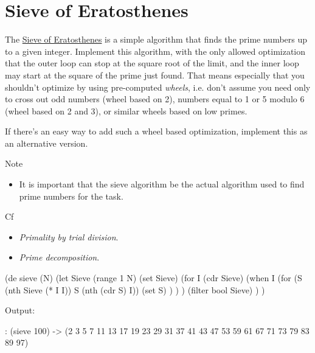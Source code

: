 \pagebreak{}
\section*{Sieve of Eratosthenes}

The \href{http://en.wikipedia.org/wiki/Sieve\_of\_Eratosthenes}{Sieve of
Eratosthenes} is a simple algorithm that finds the prime numbers up to a
given integer. Implement this algorithm, with the only allowed
optimization that the outer loop can stop at the square root of the
limit, and the inner loop may start at the square of the prime just
found. That means especially that you shouldn't optimize by using
pre-computed \emph{wheels}, i.e. don't assume you need only to cross out
odd numbers (wheel based on 2), numbers equal to 1 or 5 modulo 6 (wheel
based on 2 and 3), or similar wheels based on low primes.

If there's an easy way to add such a wheel based optimization, implement
this as an alternative version.

\begin{description}
\item[Note]
\end{description}

\begin{itemize}
\item
  It is important that the sieve algorithm be the actual algorithm used
  to find prime numbers for the task.
\end{itemize}

\begin{description}
\item[Cf]
\end{description}

\begin{itemize}
\item \emph{Primality by trial division}.
\item \emph{Prime decomposition}.
\end{itemize}


\begin{wideverbatim}

(de sieve (N)
   (let Sieve (range 1 N)
      (set Sieve)
      (for I (cdr Sieve)
         (when I
            (for (S (nth Sieve (* I I)) S (nth (cdr S) I))
               (set S) ) ) )
      (filter bool Sieve) ) )

Output:

: (sieve 100)
-> (2 3 5 7 11 13 17 19 23 29 31 37 41 43 47 53 59 61 67 71 73 79 83 89 97)

\end{wideverbatim}

